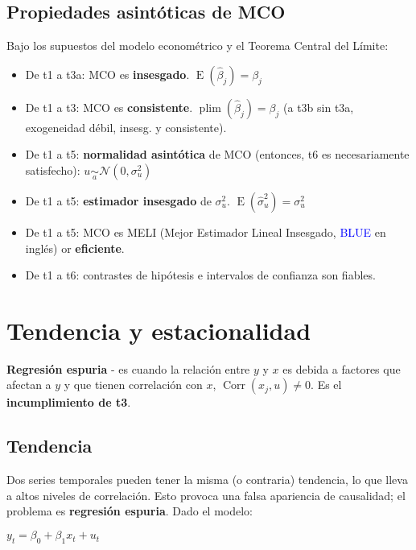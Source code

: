 \documentclass[10pt, a4paper, landscape]{article}
\DeclareMathOperator{\E}{E}
\DeclareMathOperator{\Corr}{Corr}
\begin{document}
\begin{multicols}{3}
\subsection*{Propiedades asintóticas de MCO}

Bajo los supuestos del modelo econométrico y el Teorema Central del Límite:

\begin{itemize}[leftmargin=*]
	\item De t1 a t3a: MCO es \textbf{insesgado}. \( \E(\hat{\beta}_{j}) = \beta_{j} \)
	\item De t1 a t3: MCO es \textbf{consistente}. \( \operatorname{plim}(\hat{\beta}_{j}) = \beta_{j} \) (a t3b sin t3a, exogeneidad débil, insesg. y consistente).
	\item De t1 a t5: \textbf{normalidad asintótica} de MCO (entonces, t6 es necesariamente satisfecho): \( u \underset{a}{\sim} \mathcal{N} (0, \sigma_{u}^{2}) \)
	\item De t1 a t5: \textbf{estimador insesgado} de \( \sigma_{u}^{2} \). \( \E(\hat{\sigma}_{u}^{2}) = \sigma^{2}_{u} \)
	\item De t1 a t5: MCO es MELI (Mejor Estimador Lineal Insesgado, \textcolor{blue}{BLUE} en inglés) or \textbf{eficiente}.
	\item De t1 a t6: contrastes de hipótesis e intervalos de confianza son fiables.
\end{itemize}

\columnbreak

\section*{Tendencia y estacionalidad}

\textbf{Regresión espuria} - es cuando la relación entre \( y \) y \( x \) es debida a factores que afectan a \( y \) y que tienen correlación con \( x \), \( \Corr(x_{j}, u) \neq 0 \). Es el \textbf{incumplimiento de t3}.

\subsection*{Tendencia}

Dos series temporales pueden tener la misma (o contraria) tendencia, lo que lleva a altos niveles de correlación. Esto provoca una falsa apariencia de causalidad; el problema es \textbf{regresión espuria}. Dado el modelo:

\begin{center}
	\( y_{t} = \beta_{0} + \beta_{1} x_{t} + u_{t} \)
\end{center}


\end{multicols}
\end{document}
